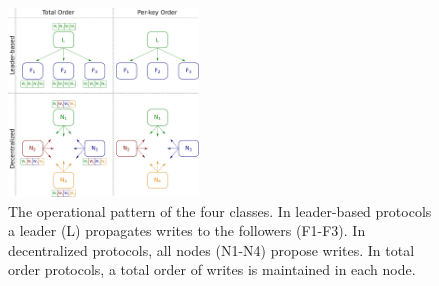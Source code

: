 \begin{figure}[t]
  \centering
  \includegraphics[width=0.45\textwidth]{1_figures/tax-fig.pdf}
  \caption{The operational pattern of the four classes. In leader-based protocols a leader (L) propagates writes to the followers (F1-F3). 
  In decentralized protocols, all nodes (N1-N4) propose writes.
  In total order protocols, a total order of writes is maintained in each node.}
  \label{fig:tax}
\end{figure}